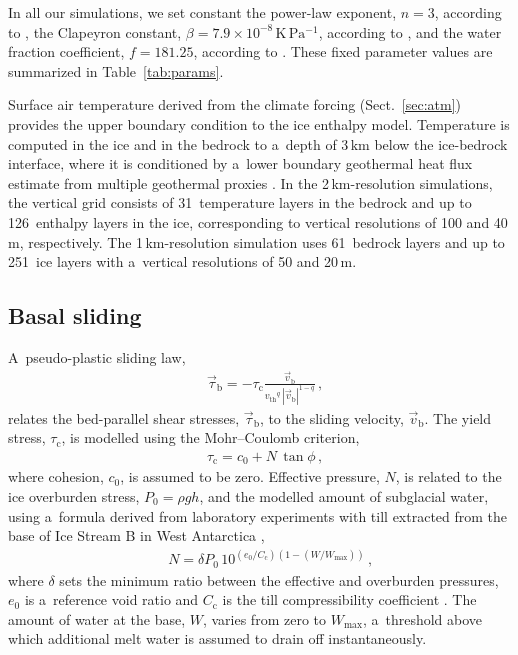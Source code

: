\documentclass{article}
\newcommand{\unit}[1]{\ensuremath{\mathrm{#1}}}
\begin{document}
    In all our simulations, we set constant the power-law exponent, $n=3$,
    according to \citet[p.~55--57]{Cuffey.Paterson.2010}, the Clapeyron
    constant, $\beta=7.9\times 10^{-8}$\,\unit{K\,Pa^{-1}}, according to
    \citet{Luthi.etal.2002}, and the water fraction coefficient, $f=181.25$,
    according to \citet{Lliboutry.Duval.1985}. These fixed parameter values are
    summarized in Table~\ref{tab:params}.

    Surface air temperature derived from the climate forcing
    (Sect.~\ref{sec:atm}) provides the upper boundary condition to the ice
    enthalpy model. Temperature is computed in the ice and in the bedrock to
    a~depth of 3\,\unit{km} below the ice-bedrock interface, where it is
    conditioned by a~lower boundary geothermal heat flux estimate from multiple
    geothermal proxies \citep[similarity method]{Goutorbe.etal.2011}. In the
    2\,km-resolution simulations, the vertical grid consists of 31~temperature
    layers in the bedrock and up to 126~enthalpy layers in the ice,
    corresponding to vertical resolutions of 100 and 40\,\unit{m},
    respectively. The 1\,km-resolution simulation uses 61~bedrock layers and up
    to 251~ice layers with a~vertical resolutions of 50 and 20\,\unit{m}.

\subsection{Basal sliding}
\label{sec:sliding}

      A~pseudo-plastic sliding law,
%
\begin{align}
&\label{eqn:pseudoplastic}
    \vec{\tau}_{\mathrm{b}} = -\tau_{\mathrm{c}} \frac{\vec{v}_{\mathrm{b}}}{{v_{\text{th}}}^q\,|\vec{v}_{\mathrm{b}}|^{1-q}} \,,
\end{align}
%
      relates the bed-parallel shear stresses, $\vec{\tau}_{\mathrm{b}}$, to
      the sliding velocity, $\vec{v}_{\mathrm{b}}$.
      The yield stress, $\tau_{\mathrm{c}}$, is modelled using the
      Mohr--Coulomb criterion,
%
\begin{align}
&\tau_{\mathrm{c}} = c_0 + N\,\tan{\phi} \,,
\end{align}
%
      where cohesion, $c_0$, is assumed to be zero. Effective pressure, $N$,
      is related to the ice overburden stress, $P_0=\rho gh$, and the
      modelled amount of
      subglacial water, using a~formula derived from laboratory experiments
      with till extracted from the base of Ice Stream B in West Antarctica
      \citep{Tulaczyk.etal.2000, Bueler.Pelt.2015},
%
\begin{align}
&\label{eqn:ntil}
&N = \delta P_0 \, 10^{(e_0/C_{\mathrm{c}}) (1 - (W/W_{\text{max}}))} \,,
\end{align}
%
      where $\delta$ sets the minimum ratio between the effective and
      overburden pressures, $e_0$ is a~reference void ratio and
      $C_{\mathrm{c}}$ is the till compressibility coefficient
      \citep{Tulaczyk.etal.2000}. The amount of water at the base, $W$,
      varies from zero to $W_{\text{max}}$, a~threshold above which
      additional melt water is assumed to drain off instantaneously.
\end{document}
